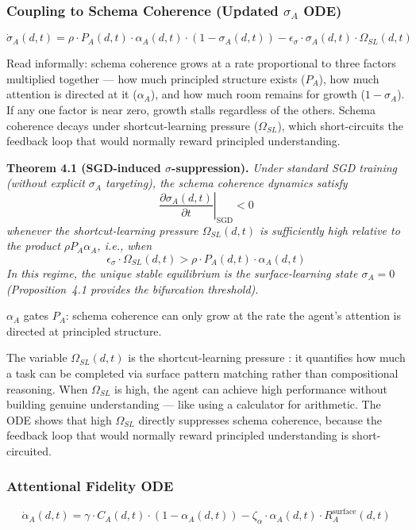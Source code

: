 \documentclass[11pt,a4paper]{article}
\begin{document}
\subsubsection{Coupling to Schema Coherence (Updated \texorpdfstring{$\sigma_A$}{sigma\_A} ODE)}
\begin{equation}\label{eq:sigma-ode}
\dot{\sigma}_A(d,t) = \rho \cdot P_A(d,t) \cdot \alpha_A(d,t) \cdot (1 - \sigma_A(d,t)) - \epsilon_{\sigma} \cdot \sigma_A(d,t) \cdot \Omega_{SL}(d,t)
\end{equation}

Read informally: schema coherence grows at a rate proportional to three factors multiplied together --- how much principled structure exists ($P_A$), how much attention is directed at it ($\alpha_A$), and how much room remains for growth ($1 - \sigma_A$). If any one factor is near zero, growth stalls regardless of the others. Schema coherence decays under shortcut-learning pressure ($\Omega_{SL}$), which short-circuits the feedback loop that would normally reward principled understanding.

\textbf{Theorem 4.1 (SGD-induced $\sigma$-suppression).}
\textit{Under standard SGD training (without explicit $\sigma_A$ targeting), the schema coherence dynamics satisfy}
\[
\left.\frac{\partial \sigma_A(d,t)}{\partial t}\right|_{\text{SGD}} < 0
\]
\textit{whenever the shortcut-learning pressure $\Omega_{SL}(d,t)$ is sufficiently high relative to the product $\rho P_A \alpha_A$, i.e., when}
\[
\epsilon_{\sigma} \cdot \Omega_{SL}(d,t) > \rho \cdot P_A(d,t) \cdot \alpha_A(d,t)
\]
\textit{In this regime, the unique stable equilibrium is the surface-learning state $\sigma_A = 0$ (Proposition~4.1 provides the bifurcation threshold).}

$\alpha_A$ gates $P_A$: schema coherence can only grow at the rate the
agent's attention is directed at principled structure.

The variable $\Omega_{SL}(d,t)$ is the shortcut-learning pressure \citep{geirhos2020shortcutlearning}: it quantifies how much a task can be completed via surface pattern matching rather than compositional reasoning. When $\Omega_{SL}$ is high, the agent can achieve high performance without building genuine understanding --- like using a calculator for arithmetic. The ODE shows that high $\Omega_{SL}$ directly suppresses schema coherence, because the feedback loop that would normally reward principled understanding is short-circuited.

\subsubsection{Attentional Fidelity ODE}
\begin{equation}\label{eq:alpha-ode}
\dot{\alpha}_A(d,t) = \gamma \cdot C_A(d,t) \cdot (1 - \alpha_A(d,t)) - \zeta_{\alpha} \cdot \alpha_A(d,t) \cdot R_A^{\text{surface}}(d,t)
\end{equation}
\end{document}
